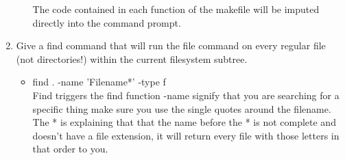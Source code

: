 \documentclass[letterpaper,10pt,titlepage,fleqn]{article}
\begin{document}
\begin{enumerate}
\begin{itemize}
The code contained in each function of the makefile will be imputed directly into the command prompt. 
\end{itemize}
\item Give a find command that will run the file command on every regular file (not directories!) within the current filesystem subtree.
\begin{itemize}
\item find . -name 'Filename*' -type f\\
Find triggers the find function -name signify that you are searching for a specific thing make sure you use the single quotes around the filename. The * is explaining that that the name before the * is not complete and doesn't have a file extension, it will return every file with those letters in that order to you.
\end{itemize}
\end{enumerate}
\end{document}
